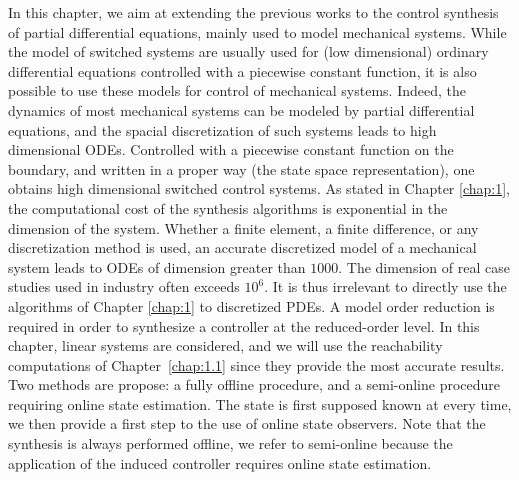 
\graphicspath{{part_5/figures}{part_5/figures/}}



In this chapter, we aim at extending the previous works to the control
synthesis of partial differential equations, mainly used to model mechanical systems. 
While the model of switched systems are usually used for (low dimensional)
ordinary differential equations controlled with a piecewise constant function,
it is also possible to use these models for control of mechanical systems. 
Indeed, the dynamics of most mechanical 
systems can be modeled by partial differential equations, and the spacial discretization
of such systems leads to high dimensional ODEs. Controlled with a piecewise constant function on
the boundary, and written in a proper way (the state space representation), 
one obtains high dimensional switched control systems.
As stated in Chapter \ref{chap:1}, the computational cost of the synthesis algorithms
is exponential in the dimension of the system.
Whether a finite element, a finite difference, or any discretization method is used,
an accurate discretized model of a mechanical system leads to ODEs of dimension
greater than $1000$. The dimension of real case studies used in industry 
often exceeds $10^6$. 
It is thus irrelevant to directly use the algorithms of Chapter \ref{chap:1} to
discretized PDEs. 
A model order reduction is required in order to synthesize a controller 
at the reduced-order level.
In this chapter, linear systems are considered, and we will use 
the reachability computations of Chapter~\ref{chap:1.1} since 
they provide the most accurate results. 
Two methods are propose: a fully offline procedure, and a semi-online procedure 
requiring online state estimation.
The state is first supposed known at every time, we then provide a first step
to the use of online state observers. 
Note that the synthesis is always performed offline, we refer to semi-online because the application
of the induced controller requires online state estimation.





